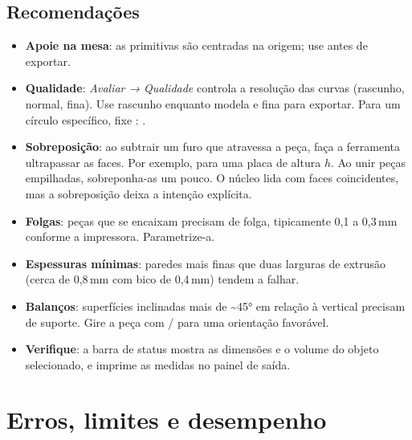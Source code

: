 \subsection{Recomendações}
\begin{itemize}
  \item \textbf{Apoie na mesa}: as primitivas são centradas na origem; use  antes de exportar.
  \item \textbf{Qualidade}: \emph{Avaliar → Qualidade} controla a resolução das curvas (rascunho, normal, fina). Use rascunho enquanto modela e
    fina para exportar. Para um círculo específico, fixe : .
  \item \textbf{Sobreposição}: ao subtrair um furo que atravessa a peça, faça a ferramenta ultrapassar as faces. Por exemplo,
     para uma placa de altura $h$. Ao unir peças empilhadas, sobreponha-as um pouco.
    O núcleo lida com faces coincidentes, mas a sobreposição deixa a intenção explícita.
  \item \textbf{Folgas}: peças que se encaixam precisam de folga, tipicamente 0,1 a 0,3\,mm conforme a impressora. Parametrize-a.
  \item \textbf{Espessuras mínimas}: paredes mais finas que duas larguras de extrusão (cerca de 0,8\,mm com bico de 0,4\,mm) tendem a falhar.
  \item \textbf{Balanços}: superfícies inclinadas mais de \textasciitilde45° em relação à vertical precisam de suporte. Gire a peça com / para uma orientação favorável.
  \item \textbf{Verifique}: a barra de status mostra as dimensões e o volume do objeto selecionado, e  imprime as medidas no painel de saída.
\end{itemize}

\section{Erros, limites e desempenho}\label{sec:erros}

